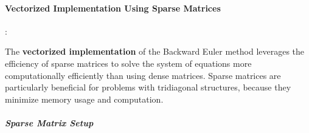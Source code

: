 \documentclass{article}
\begin{document}

		
			\paragraph{Vectorized Implementation Using Sparse Matrices}:
			\newline
			\vspace{0.1em} %
			\newline
			
			The \textbf{vectorized implementation} of the Backward Euler method leverages the efficiency of sparse matrices to solve the system of equations more computationally efficiently than using dense matrices. Sparse matrices are particularly beneficial for problems with tridiagonal structures, because they minimize memory usage and computation.
			
			\subparagraph{Sparse Matrix Setup}
			
\end{document}

